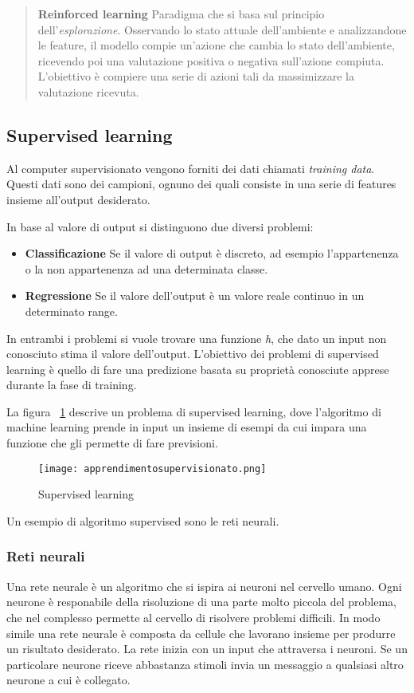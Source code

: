 \documentclass[../main.tex]{subfiles}
\begin{document}
\begin{verse}
				\textbf{Reinforced learning} Paradigma che si basa sul principio dell'\textit{esplorazione}. Osservando lo stato attuale dell'ambiente e analizzandone le feature, il modello compie un'azione che cambia lo stato dell'ambiente, ricevendo poi una valutazione positiva o negativa sull'azione compiuta. L'obiettivo è compiere una serie di azioni tali da massimizzare la valutazione ricevuta.
\end{verse}

\subsection{Supervised learning}
Al computer supervisionato vengono forniti dei dati chiamati \textit{training data}. Questi dati sono dei campioni, ognuno dei quali consiste in una serie di features insieme all'output desiderato.

In base al valore di output si distinguono due diversi problemi:

\begin{itemize}
				\item \textbf{Classificazione} Se il valore di output è discreto, ad esempio l'appartenenza o la non appartenenza ad una determinata classe.
				\item \textbf{Regressione} Se il valore dell'output è un valore reale continuo in un determinato range.
\end{itemize}

In entrambi i problemi si vuole trovare una funzione \textit{h}, che dato un input non conosciuto stima il valore dell'output. L'obiettivo dei problemi di supervised learning è quello di fare una predizione basata su proprietà conosciute apprese durante la fase di training.

La figura ~\ref{fig:supervisedLearning} descrive un problema di supervised learning, dove l'algoritmo di machine learning prende in input un insieme di esempi da cui impara una funzione che gli permette di fare previsioni.

\begin{figure}[H]
				\centering
				\texttt{[image: apprendimentosupervisionato.png]}
				\caption{Supervised learning}
				\label{fig:supervisedLearning}
\end{figure}

Un esempio di algoritmo supervised sono le reti neurali.
\subsubsection{Reti neurali}
Una rete neurale è un algoritmo che si ispira ai neuroni nel cervello umano. Ogni neurone è responabile della risoluzione di una parte molto piccola del problema, che nel complesso permette al cervello di risolvere problemi difficili. In modo simile una rete neurale è composta da cellule che lavorano insieme per produrre un risultato desiderato. La rete inizia con un input che attraversa i neuroni. Se un particolare neurone riceve abbastanza stimoli invia un messaggio a qualsiasi altro neurone a cui è collegato.
\end{document}

